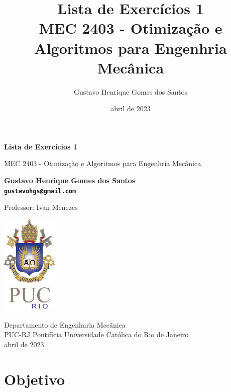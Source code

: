 \documentclass[10pt, a4paper]{article}
\begin{document}
\def\TITLE{Lista de Exercícios 1}
\def\DISCIPLINE{MEC 2403 - Otimização e Algoritmos para Engenhria Mecânica}
\def\PROFESSOR{Ivan Menezes}
\def\AUTHOR{Gustavo Henrique Gomes dos Santos}
\def\CONTACT{gustavohgs@gmail.com}
\def\DATE{abril de 2023}

\title{\textbf{\TITLE} \\ \DISCIPLINE}
\author{\AUTHOR}
\date{\DATE}

\begin{titlepage}
      \begin{center}
          \vspace*{1cm}

          \Huge
          \textbf{\TITLE}

          \vspace{0.5cm}
          \LARGE
          \DISCIPLINE

          \vspace{1.5cm}

          \textbf{\AUTHOR \\ {\tt \CONTACT}}

          \vfill
          Professor: \PROFESSOR

          \vspace{0.8cm}

          \includegraphics[width=0.2\textwidth]{../general/puc.jpg}

          \Large
          Departamento de Engenharia Mecânica\\
          PUC-RJ Pontifícia Universidade Católica do Rio de Janeiro\\
          \DATE

      \end{center}
  \end{titlepage}

\maketitle

\section{Objetivo}
\end{document}
